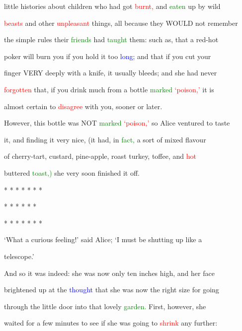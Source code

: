  little histories about \textcolor{BurntOrange}{children} who had got \textcolor{red}{burnt,} and \textcolor{green}{eaten} up by \textcolor{BurntOrange}{wild}

 \textcolor{red}{beasts} and other \textcolor{red}{unpleasant} things, all because they WOULD not remember

 the simple \textcolor{BurntOrange}{rules} their \textcolor{green}{friends} had \textcolor{green}{taught} them: such as, that a red-hot

 poker will burn you if you hold it too \textcolor{blue}{long;} and that if you cut your

 finger VERY deeply with a knife, it usually bleeds; and she had never

 \textcolor{red}{forgotten} that, if you drink much from a bottle \textcolor{green}{marked} \textcolor{red}{‘poison,’} it is

 almost certain to \textcolor{red}{disagree} with you, sooner or later.



 However, this bottle was NOT \textcolor{green}{marked} \textcolor{red}{‘poison,’} so Alice ventured to taste

 it, and finding it very nice, (it had, in \textcolor{green}{fact,} a sort of mixed flavour

 of cherry-tart, custard, pine-apple, roast turkey, toffee, and \textcolor{red}{hot}

 buttered \textcolor{green}{toast,)} she very soon finished it off.



 * * * * * * *



 * * * * * *



 * * * * * * *



 ‘What a curious feeling!’ said Alice; ‘I must be shutting up like a

 telescope.’



 And so it was indeed: she was now only ten inches high, and her face

 \textcolor{BurntOrange}{brightened} up at the \textcolor{blue}{thought} that she was now the right size for going

 through the little door into that \textcolor{BurntOrange}{lovely} \textcolor{green}{garden.} First, however, she

 \textcolor{BurntOrange}{waited} for a few minutes to see if she was going to \textcolor{red}{shrink} any further:

